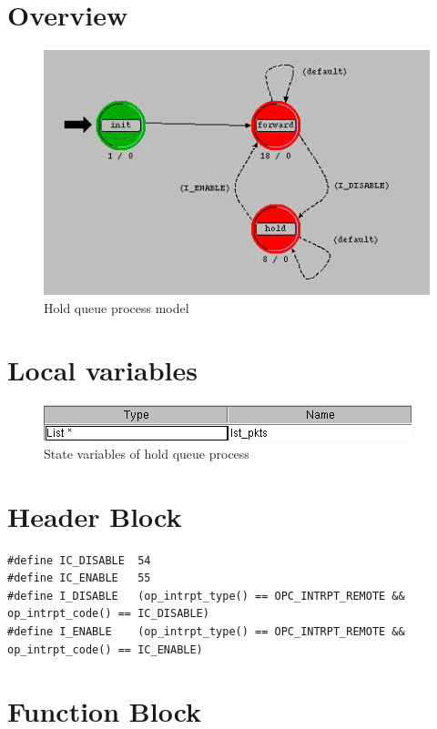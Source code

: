 
\section{Overview}
\begin{figure}[ht]
    \centering
    \includegraphics[width=.7\textwidth]{images/hold_queue}
    \caption{Hold queue process model}
    \label{fig:appendix-e}
\end{figure}

\newpage

\section{Local variables}
\begin{figure}[ht]
    \centering
    \includegraphics[width=.7\textwidth]{images/state_variable_hold_queue}
    \caption{State variables of hold queue process}
    \label{fig:appendix-e_sv}
\end{figure}

\section{Header Block}
{\tiny
\begin{verbatim}
#define IC_DISABLE	54
#define IC_ENABLE	55
#define I_DISABLE	(op_intrpt_type() == OPC_INTRPT_REMOTE && op_intrpt_code() == IC_DISABLE)
#define I_ENABLE	(op_intrpt_type() == OPC_INTRPT_REMOTE && op_intrpt_code() == IC_ENABLE)

\end{verbatim}
}

\section{Function Block}
{\tiny
\begin{verbatim}


\end{verbatim}
}
